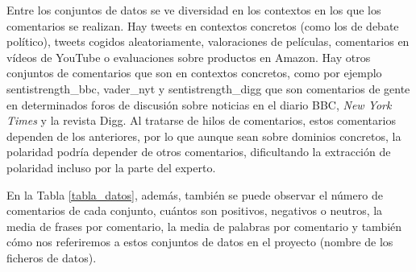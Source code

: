 Entre los conjuntos de datos se ve diversidad en los contextos en los que los comentarios se realizan. Hay tweets en contextos concretos (como los de debate político), tweets cogidos aleatoriamente, valoraciones de películas, comentarios en vídeos de YouTube o evaluaciones sobre productos en Amazon. Hay otros conjuntos de comentarios que son en contextos concretos, como por ejemplo sentistrength\_bbc, vader\_nyt y sentistrength\_digg que son comentarios de gente en determinados foros de discusión sobre noticias en el diario BBC, \textit{New York Times} y la revista Digg. Al tratarse de hilos de comentarios, estos comentarios dependen de los anteriores, por lo que aunque sean sobre dominios concretos, la polaridad podría depender de otros comentarios, dificultando la extracción de polaridad incluso por la parte del experto. 


En la Tabla \ref{tabla_datos}, además, también se puede observar el número de comentarios de cada conjunto, cuántos son positivos, negativos o neutros, la media de frases por comentario, la media de palabras por comentario y también cómo nos referiremos a estos conjuntos de datos en el proyecto (nombre de los ficheros de datos).

